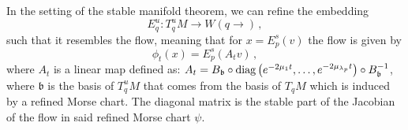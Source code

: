 \begin{theorem}\label{thm:morse-refinedUnstableEmbedding}
	In the setting of the stable manifold theorem, we can refine the embedding
\begin{equation*}
	E^u_q:T^u_q M \to W(q\to )\,, 
\end{equation*}
	such that it resembles the flow, meaning that for $x=E^s_p(v)$
	the flow is given by
	\begin{equation*}
		\phi_t(x)=E^s_p(A_tv)\, ,
	\end{equation*} where $A_t$ is a linear map defined as:
	$A_t=B_{\mathfrak{b}}\circ \mathrm{diag}\left(e^{-2\mu_{1} t},\dots,e^{-2\mu_{\lambda_p} t} \right)\circ B_{\mathfrak{b}}^{-1}$, where $\mathfrak{b}$ is the basis of $T^u_qM$ that comes from the basis of $T_qM$ which is induced by a refined Morse chart. The diagonal matrix is the stable part of the Jacobian of the flow in said refined Morse chart $\psi$.
\end{theorem}
